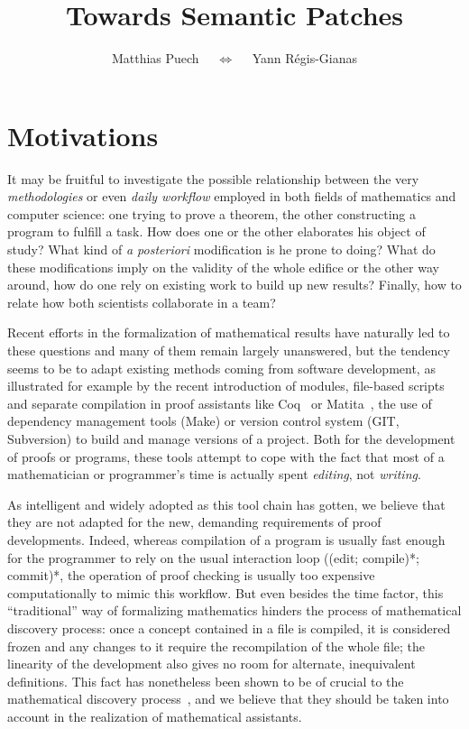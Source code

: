 \documentclass{article}
\title{Towards Semantic Patches}
\author{Matthias Puech $\quad\Leftrightarrow\quad$ Yann Régis-Gianas}
\date{}
\newcommand{\remplan}[1]{}
\begin{document}
\maketitle

\section{Motivations}

\remplan{Motivations générales}

It may be fruitful to investigate the possible relationship between the
very \emph{methodologies} or even \emph{daily workflow} employed in
both fields of mathematics and computer science: one trying to prove a
theorem, the other constructing a program to fulfill a task. How does
one or the other elaborates his object of study? What kind of \emph{a
  posteriori} modification is he prone to doing? What do these
modifications imply on the validity of the whole edifice or the other
way around, how do one rely on existing work to build up new results?
Finally, how to relate how both scientists collaborate in a team?

Recent efforts in the formalization of mathematical results have
naturally led to these questions and many of them remain largely
unanswered, but the tendency seems to be to adapt existing methods
coming from software development, as illustrated for example by the
recent introduction of modules, file-based scripts and separate
compilation in proof assistants like \textsf{Coq}~{\cite{CoqDocWeb}}
or \textsf{Matita}~{\cite{Asperti06userinteraction}}, the use of
dependency management tools (\textsf{Make}) or version control system
(\textsf{GIT}, \textsf{Subversion}) to build and manage versions of a
project. Both for the development of proofs or programs, these tools
attempt to cope with the fact that most of a mathematician or
programmer's time is actually spent \emph{editing}, not
\emph{writing}.

As intelligent and widely adopted as this tool chain has gotten, we
believe that they are not adapted for the new, demanding requirements
of proof developments. Indeed, whereas compilation of a program is
usually fast enough for the programmer to rely on the usual
interaction loop ((edit; compile)*; commit)*, the operation of proof
checking is usually too expensive computationally to mimic this
workflow. But even besides the time factor, this ``traditional'' way
of formalizing mathematics hinders the process of mathematical
discovery process: once a concept contained in a file is compiled, it
is considered frozen and any changes to it require the recompilation
of the whole file; the linearity of the development also gives no room
for alternate, inequivalent definitions. This fact has nonetheless
been shown to be of crucial to the mathematical discovery
process~\cite{lakatos1964proofs}, and we believe that they should be
taken into account in the realization of mathematical assistants.
\end{document}

